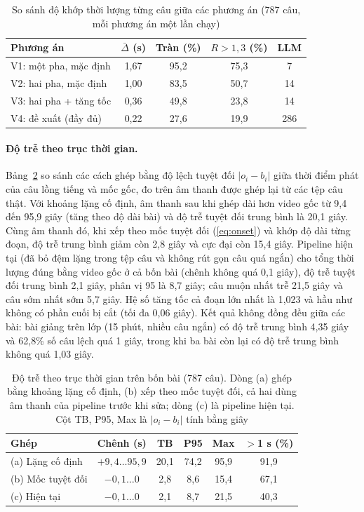 \documentclass{IEEEtran}
\begin{document}
\begin{table}[t]
\caption{So sánh độ khớp thời lượng từng câu giữa các phương án (787 câu, mỗi phương án một lần chạy)}
\label{tab:results}
\centering
\setlength{\tabcolsep}{3pt}
\begin{tabular}{|l|c|c|c|c|}
\hline
\textbf{Phương án} & \textbf{$\bar{\Delta}$ (s)} & \textbf{Tràn (\%)} & \textbf{$R>1{,}3$ (\%)} & \textbf{LLM} \\
\hline
V1: một pha, mặc định & 1,67 & 95,2 & 75,3 & 7 \\
V2: hai pha, mặc định & 1,00 & 83,5 & 50,7 & 14 \\
V3: hai pha + tăng tốc & 0,36 & 49,8 & 23,8 & 14 \\
V4: đề xuất (đầy đủ) & 0,22 & 27,6 & 19,9 & 286 \\
\hline
\end{tabular}
\end{table}

\paragraph{Độ trễ theo trục thời gian.} Bảng~\ref{tab:timeline} so sánh các cách ghép bằng độ lệch tuyệt đối $|o_i - b_i|$ giữa thời điểm phát của câu lồng tiếng và mốc gốc, đo trên âm thanh được ghép lại từ các tệp câu thật. Với khoảng lặng cố định, âm thanh sau khi ghép dài hơn video gốc từ 9,4 đến 95,9 giây (tăng theo độ dài bài) và độ trễ tuyệt đối trung bình là 20,1 giây. Cùng âm thanh đó, khi xếp theo mốc tuyệt đối (\ref{eq:onset}) và khớp độ dài từng đoạn, độ trễ trung bình giảm còn 2,8 giây và cực đại còn 15,4 giây. Pipeline hiện tại (đã bỏ đệm lặng trong tệp câu và không rút gọn câu quá ngắn) cho tổng thời lượng đúng bằng video gốc ở cả bốn bài (chênh không quá 0,1 giây), độ trễ tuyệt đối trung bình 2,1 giây, phân vị 95 là 8,7 giây; câu muộn nhất trễ 21,5 giây và câu sớm nhất sớm 5,7 giây. Hệ số tăng tốc cả đoạn lớn nhất là 1,023 và hầu như không có phần cuối bị cắt (tối đa 0,06 giây). Kết quả không đồng đều giữa các bài: bài giảng trên lớp (15 phút, nhiều câu ngắn) có độ trễ trung bình 4,35 giây và 62,8\% số câu lệch quá 1 giây, trong khi ba bài còn lại có độ trễ trung bình không quá 1,03 giây.

\begin{table}[t]
\caption{Độ trễ theo trục thời gian trên bốn bài (787 câu). Dòng (a) ghép bằng khoảng lặng cố định, (b) xếp theo mốc tuyệt đối, cả hai dùng âm thanh của pipeline trước khi sửa; dòng (c) là pipeline hiện tại. Cột TB, P95, Max là $|o_i - b_i|$ tính bằng giây}
\label{tab:timeline}
\centering
\setlength{\tabcolsep}{3pt}
\begin{tabular}{|l|c|c|c|c|c|}
\hline
\textbf{Ghép} & \textbf{Chênh (s)} & \textbf{TB} & \textbf{P95} & \textbf{Max} & \textbf{$>$1 s (\%)} \\
\hline
(a) Lặng cố định & $+9{,}4\ldots95{,}9$ & 20,1 & 74,2 & 95,9 & 91,9 \\
(b) Mốc tuyệt đối & $-0{,}1\ldots0$ & 2,8 & 8,6 & 15,4 & 67,1 \\
(c) Hiện tại & $-0{,}1\ldots0$ & 2,1 & 8,7 & 21,5 & 40,3 \\
\hline
\end{tabular}
\end{table}
\end{document}
